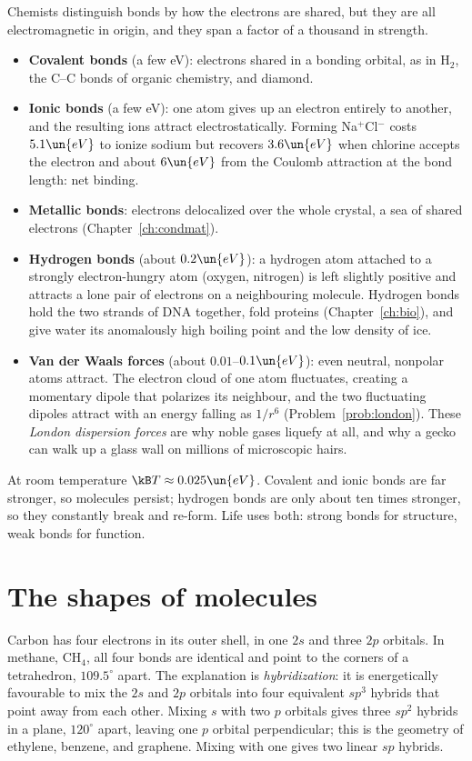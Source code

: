 Chemists distinguish bonds by how the electrons are shared, but they are all electromagnetic in origin, and they span a factor of a thousand in strength.
\begin{itemize}[itemsep=4pt]
  \item \textbf{Covalent bonds} (a few eV): electrons shared in a bonding orbital, as in H$_2$, the C--C bonds of organic chemistry, and diamond.
  \item \textbf{Ionic bonds} (a few eV): one atom gives up an electron entirely to another, and the resulting ions attract electrostatically. Forming Na$^+$Cl$^-$ costs $5.1\un{eV}$ to ionize sodium but recovers $3.6\un{eV}$ when chlorine accepts the electron and about $6\un{eV}$ from the Coulomb attraction at the bond length: net binding.
  \item \textbf{Metallic bonds}: electrons delocalized over the whole crystal, a sea of shared electrons (Chapter~\ref{ch:condmat}).
  \item \textbf{Hydrogen bonds} (about $0.2\un{eV}$): a hydrogen atom attached to a strongly electron-hungry atom (oxygen, nitrogen) is left slightly positive and attracts a lone pair of electrons on a neighbouring molecule. Hydrogen bonds hold the two strands of DNA together, fold proteins (Chapter~\ref{ch:bio}), and give water its anomalously high boiling point and the low density of ice.
  \item \textbf{Van der Waals forces} (about $0.01$--$0.1\un{eV}$): even neutral, nonpolar atoms attract. The electron cloud of one atom fluctuates, creating a momentary dipole that polarizes its neighbour, and the two fluctuating dipoles attract with an energy falling as $1/r^6$ (Problem~\ref{prob:london}). These \emph{London dispersion forces} are why noble gases liquefy at all, and why a gecko can walk up a glass wall on millions of microscopic hairs.
\end{itemize}
At room temperature $\kB T\approx0.025\un{eV}$. Covalent and ionic bonds are far stronger, so molecules persist; hydrogen bonds are only about ten times stronger, so they constantly break and re-form. Life uses both: strong bonds for structure, weak bonds for function.

\section{The shapes of molecules}

Carbon has four electrons in its outer shell, in one $2s$ and three $2p$ orbitals. In methane, CH$_4$, all four bonds are identical and point to the corners of a tetrahedron, $109.5^\circ$ apart. The explanation is \emph{hybridization}: it is energetically favourable to mix the $2s$ and $2p$ orbitals into four equivalent $sp^3$ hybrids that point away from each other. Mixing $s$ with two $p$ orbitals gives three $sp^2$ hybrids in a plane, $120^\circ$ apart, leaving one $p$ orbital perpendicular; this is the geometry of ethylene, benzene, and graphene. Mixing with one gives two linear $sp$ hybrids.


